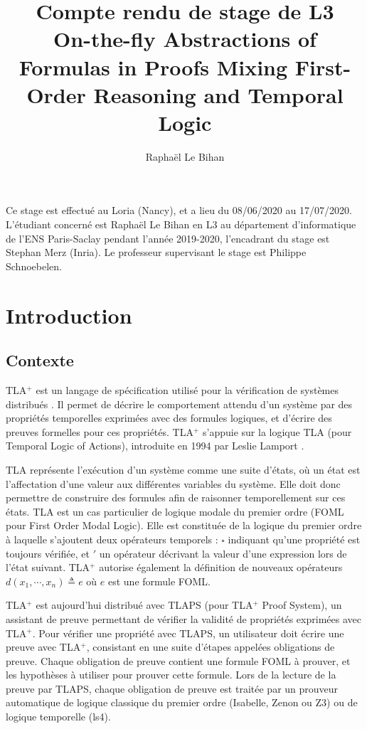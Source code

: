 \documentclass[12pt]{article}
\title{%
  Compte rendu de stage de L3\\
  \vspace{8pt}
  \large On-the-fly Abstractions of Formulas in Proofs
Mixing First-Order Reasoning and Temporal Logic}
\author{Raphaël Le Bihan}
\newcommand{\bpar}[1]{\marginpar{\color{myblue}\footnotesize\raggedright#1}}
\begin{document}
\fancyfoot[CEO]{\thepage}

\maketitle

Ce stage est effectué au Loria (Nancy), et a lieu du 08/06/2020 au 17/07/2020.
L'étudiant concerné est Raphaël Le Bihan en L3 au département d'informatique de l'ENS Paris-Saclay pendant l'année 2019-2020, l'encadrant du stage est Stephan Merz (Inria).
Le professeur supervisant le stage est Philippe Schnoebelen.

\setcounter{tocdepth}{2}
\tableofcontents

\section{Introduction}

\subsection{Contexte}

TLA$^+$ est un langage de spécification utilisé pour la vérification de systèmes distribués \cite{lamport2002}.
Il permet de décrire le comportement attendu d'un système par des propriétés temporelles exprimées avec des formules logiques, et d'écrire des preuves formelles pour ces propriétés.
TLA$^+$ s'appuie sur la logique TLA (pour Temporal Logic of Actions), introduite en 1994 par Leslie Lamport \cite{lamport1994}.

TLA représente l'exécution d'un système comme une suite d'états, où un état est l'affectation d'une valeur aux différentes variables du système.
Elle doit donc permettre de construire des formules afin de raisonner temporellement sur ces états.
TLA est un cas particulier de logique modale du premier ordre (FOML pour First Order Modal Logic).
Elle est constituée de la logique du premier ordre à laquelle s'ajoutent deux opérateurs temporels : $\square$ indiquant qu'une propriété est toujours vérifiée, et $'$ un opérateur décrivant la valeur d'une expression lors de l'état suivant.
\textcolor{myblue}{TLA$^+$} autorise également la définition de nouveaux opérateurs $d(x_1, \cdots, x_n) \triangleq e$ où $e$ est une formule FOML.

TLA$^+$ est aujourd'hui distribué avec TLAPS \cite{TLAPSurl} (pour TLA$^+$ Proof System), un assistant de preuve permettant de vérifier la validité de propriétés exprimées avec TLA$^+$.
Pour vérifier une propriété avec TLAPS, un utilisateur doit écrire une preuve avec TLA$^+$, consistant en une suite d'étapes \bpar{qui génèrent des?} appelées obligations de preuve.
Chaque obligation de preuve contient une formule FOML à prouver, et les hypothèses à utiliser pour prouver cette formule.
Lors de la lecture de la preuve par TLAPS, chaque obligation de preuve est traitée par un prouveur automatique de logique classique du premier ordre (Isabelle, Zenon ou Z3) ou de logique temporelle (ls4).
\end{document}
